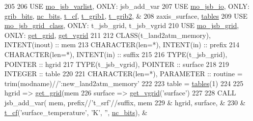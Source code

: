 \begin{DoxyCode}
205 
206     \textcolor{keywordtype}{USE }\hyperlink{namespacemo__jsb__varlist}{mo\_jsb\_varlist}\textcolor{keywordtype}{,       ONLY}: jsb\_add\_var
207     \textcolor{keywordtype}{USE }\hyperlink{namespacemo__jsb__io}{mo\_jsb\_io}\textcolor{keywordtype}{,            ONLY}: \hyperlink{namespacemo__jsb__io_aade09fd070010f905e77497f041ce6c3}{grib\_bits}, \hyperlink{namespacemo__jsb__io_a4bf2b656fa0a7acf938f0bfcad5870e3}{nc\_bits}, 
      \hyperlink{structmo__jsb__io_1_1t__cf}{t\_cf}, \hyperlink{structmo__jsb__io_1_1t__grib1}{t\_grib1}, \hyperlink{structmo__jsb__io_1_1t__grib2}{t\_grib2}, &
208                                     zaxis\_surface, \hyperlink{namespacemo__jsb__io_aefd9f08b763f8c7b6f4cdbc576e3dd14}{tables}
209     \textcolor{keywordtype}{USE }\hyperlink{namespacemo__jsb__grid__class}{mo\_jsb\_grid\_class}\textcolor{keywordtype}{,    ONLY}: t\_jsb\_grid, t\_jsb\_vgrid
210     \textcolor{keywordtype}{USE }\hyperlink{namespacemo__jsb__grid}{mo\_jsb\_grid}\textcolor{keywordtype}{,          ONLY}: \hyperlink{namespacemo__jsb__grid_ad009e7ddbafe2ef26506e2a5abdeb4db}{get\_grid}, \hyperlink{namespacemo__jsb__grid_a2111791e291579cc1551a4213a670e35}{get\_vgrid}
211 
212     \textcolor{keywordtype}{CLASS}(t\_land2atm\_memory),   \textcolor{keywordtype}{INTENT(inout)} :: mem
213     \textcolor{keywordtype}{CHARACTER(len=*)},           \textcolor{keywordtype}{INTENT(in)} :: prefix
214     \textcolor{keywordtype}{CHARACTER(len=*)},           \textcolor{keywordtype}{INTENT(in)} :: suffix
215 
216     \textcolor{keywordtype}{TYPE}(t\_jsb\_grid),        \textcolor{keywordtype}{POINTER} :: hgrid
217     \textcolor{keywordtype}{TYPE}(t\_jsb\_vgrid),       \textcolor{keywordtype}{POINTER} :: surface
218 
219     \textcolor{keywordtype}{INTEGER} :: table
220 
221     \textcolor{keywordtype}{CHARACTER(len=*)}, \textcolor{keywordtype}{PARAMETER} :: routine = trim(modname)//\textcolor{stringliteral}{':new\_land2atm\_memory'}
222 
223     table = \hyperlink{namespacemo__jsb__io_aefd9f08b763f8c7b6f4cdbc576e3dd14}{tables}(1)
224 
225     hgrid => \hyperlink{namespacemo__jsb__grid_ad009e7ddbafe2ef26506e2a5abdeb4db}{get\_grid}(mem%
226     surface => \hyperlink{namespacemo__jsb__grid_a2111791e291579cc1551a4213a670e35}{get\_vgrid}(\textcolor{stringliteral}{'surface'})
227 
228     \textcolor{keyword}{CALL }jsb\_add\_var( mem, prefix//\textcolor{stringliteral}{'t\_srf'}//suffix, mem%
229       & hgrid, surface,                                                      &
230       & \hyperlink{structmo__jsb__io_1_1t__cf}{t\_cf}(\textcolor{stringliteral}{'surface\_temperature'}, \textcolor{stringliteral}{'K'}, \textcolor{stringliteral}{''}, \hyperlink{namespacemo__jsb__io_a4bf2b656fa0a7acf938f0bfcad5870e3}{nc\_bits}),                          &

\end{DoxyCode}
